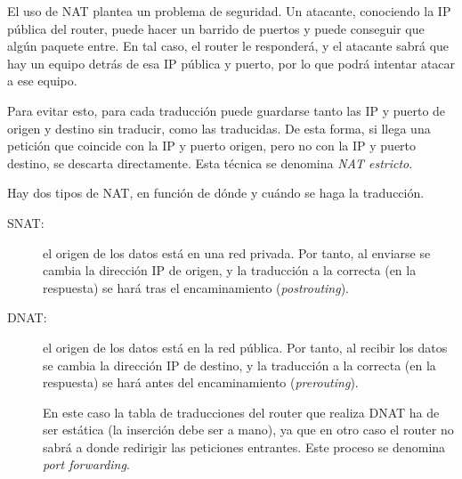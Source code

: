 \begin{observacion}
    El uso de \acrshort{NAT} plantea un problema de seguridad. Un atacante, conociendo la IP pública del router, puede hacer un barrido de puertos y puede conseguir que algún paquete entre. En tal caso, el router le responderá, y el atacante sabrá que hay un equipo detrás de esa IP pública y puerto, por lo que podrá intentar atacar a ese equipo.
    
    Para evitar esto, para cada traducción puede guardarse tanto las IP y puerto de origen y destino sin traducir, como las traducidas. De esta forma, si llega una petición que coincide con la IP y puerto origen, pero no con la IP y puerto destino, se descarta directamente. Esta técnica se denomina \textit{NAT estricto}.
\end{observacion}


Hay dos tipos de \acrshort{NAT}, en función de dónde y cuándo se haga la traducción.
\begin{description}
    \item [\acrfull{SNAT}:] el origen de los datos está en una red privada. Por tanto, al enviarse se cambia la dirección IP de origen, y la traducción a la correcta (en la respuesta) se hará tras el encaminamiento (\textit{postrouting}).
    \item [\acrfull{DNAT}:] el origen de los datos está en la red pública. Por tanto, al recibir los datos se cambia la dirección IP de destino, y la traducción a la correcta (en la respuesta) se hará antes del encaminamiento (\textit{prerouting}).
    
    En este caso la tabla de traducciones del router que realiza \acrshort{DNAT} ha de ser estática (la inserción debe ser a mano), ya que en otro caso el router no sabrá a donde redirigir las peticiones entrantes. Este proceso se denomina \textit{port forwarding}.
\end{description}


